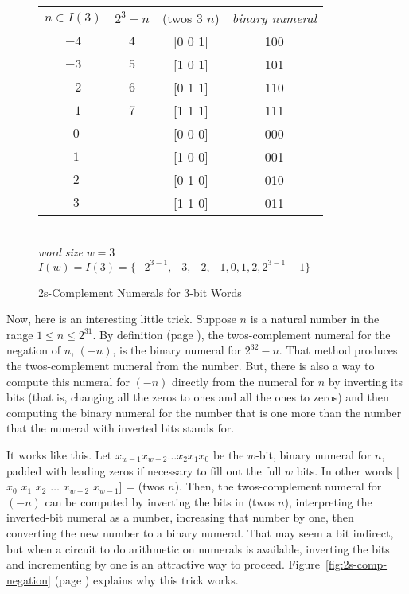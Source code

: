 \begin{figure}
\begin{center}
\begin{tabular}{cccc}
 $n \in I(3)$ & $2^3+n$  & (twos $3$ $n$)   & \emph{binary numeral} \\
 $-4$         & $4$      & [0 0 1]          & 100                   \\
 $-3$         & $5$      & [1 0 1]          & 101                   \\
 $-2$         & $6$      & [0 1 1]          & 110                   \\
 $-1$         & $7$      & [1 1 1]          & 111                   \\
 $~~0$        &          & [0 0 0]          & 000                   \\
 $~~1$        &          & [1 0 0]          & 001                   \\
 $~~2$        &          & [0 1 0]          & 010                   \\
 $~~3$        &          & [1 1 0]          & 011                   \\
\end{tabular}
\\ \emph{word size} $w = 3$
\\ $I(w) = I(3) = \{-2^{3-1}, -3, -2, -1, 0, 1, 2, 2^{3-1}-1\}$
\end{center}
\caption{2s-Complement Numerals for 3-bit Words}
\label{fig:2s-comp-3bit}
\end{figure}


Now, here is an interesting little trick.
Suppose $n$ is a natural number in the range
$1 \le n \le 2^{31}$.
By definition (page \pageref{twos-defun}),
the twos-complement numeral for the negation of $n$,
$(-n)$, is the binary numeral for $2^{32} - n$.
That method produces the twos-complement numeral from the number.
But, there is also a way to compute this numeral for $(-n)$
directly from the numeral for $n$ by inverting its bits
(that is, changing all the zeros to ones and all the ones to zeros)
and then computing the binary numeral for the number that is
one more than the number that the numeral with inverted bits stands for.

It works like this. Let $x_{w-1}x_{w-2} \dots x_2x_1x_0$
be the $w$-bit, binary numeral for $n$, padded with leading
zeros if necessary to fill out the full $w$ bits.
In other words [$x_0$ $x_1$ $x_2$ $\dots$ $x_{w-2}$ $x_{w-1}$] = (twos $n$).
Then, the twos-complement numeral for $(-n)$ can be computed
by inverting the bits in (twos $n$),
interpreting the inverted-bit numeral as a number,
increasing that number by one,
then converting the new number to a binary numeral.
That may seem a bit indirect,
but when a circuit to do arithmetic on numerals is available,
inverting the bits and incrementing by one
is an attractive way to proceed.
Figure~\ref{fig:2s-comp-negation} (page \pageref{fig:2s-comp-negation})
explains why this trick works.

